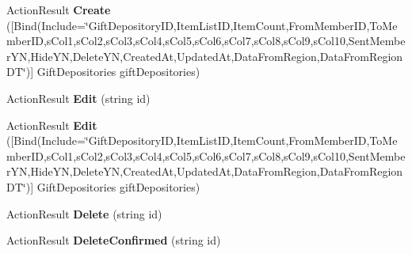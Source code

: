 \begin{DoxyCompactItemize}
\item 
Action\+Result {\bfseries Create} (\mbox{[}Bind(Include=\char`\"{}Gift\+Depository\+ID,Item\+List\+ID,Item\+Count,From\+Member\+ID,To\+Member\+ID,s\+Col1,s\+Col2,s\+Col3,s\+Col4,s\+Col5,s\+Col6,s\+Col7,s\+Col8,s\+Col9,s\+Col10,Sent\+Member\+YN,Hide\+YN,Delete\+YN,Created\+At,Updated\+At,Data\+From\+Region,Data\+From\+Region\+DT\char`\"{})\mbox{]} Gift\+Depositories gift\+Depositories)\hypertarget{class_cloud_bread_admin_web_1_1_controllers_1_1_gift_depositories_controller_aa35ddc32a96e9cb8dfb4a4b504e1944f}{}\label{class_cloud_bread_admin_web_1_1_controllers_1_1_gift_depositories_controller_aa35ddc32a96e9cb8dfb4a4b504e1944f}

\item 
Action\+Result {\bfseries Edit} (string id)\hypertarget{class_cloud_bread_admin_web_1_1_controllers_1_1_gift_depositories_controller_a3f65c373166f83a28de97d61991256eb}{}\label{class_cloud_bread_admin_web_1_1_controllers_1_1_gift_depositories_controller_a3f65c373166f83a28de97d61991256eb}

\item 
Action\+Result {\bfseries Edit} (\mbox{[}Bind(Include=\char`\"{}Gift\+Depository\+ID,Item\+List\+ID,Item\+Count,From\+Member\+ID,To\+Member\+ID,s\+Col1,s\+Col2,s\+Col3,s\+Col4,s\+Col5,s\+Col6,s\+Col7,s\+Col8,s\+Col9,s\+Col10,Sent\+Member\+YN,Hide\+YN,Delete\+YN,Created\+At,Updated\+At,Data\+From\+Region,Data\+From\+Region\+DT\char`\"{})\mbox{]} Gift\+Depositories gift\+Depositories)\hypertarget{class_cloud_bread_admin_web_1_1_controllers_1_1_gift_depositories_controller_acf856e4f0533f5e578ad1549b0a297e2}{}\label{class_cloud_bread_admin_web_1_1_controllers_1_1_gift_depositories_controller_acf856e4f0533f5e578ad1549b0a297e2}

\item 
Action\+Result {\bfseries Delete} (string id)\hypertarget{class_cloud_bread_admin_web_1_1_controllers_1_1_gift_depositories_controller_a2c4e695e78da9e766126ea5369bc6dfe}{}\label{class_cloud_bread_admin_web_1_1_controllers_1_1_gift_depositories_controller_a2c4e695e78da9e766126ea5369bc6dfe}

\item 
Action\+Result {\bfseries Delete\+Confirmed} (string id)\hypertarget{class_cloud_bread_admin_web_1_1_controllers_1_1_gift_depositories_controller_a61fc8612e2273fbd328624e99823ba0d}{}\label{class_cloud_bread_admin_web_1_1_controllers_1_1_gift_depositories_controller_a61fc8612e2273fbd328624e99823ba0d}

\end{DoxyCompactItemize}
